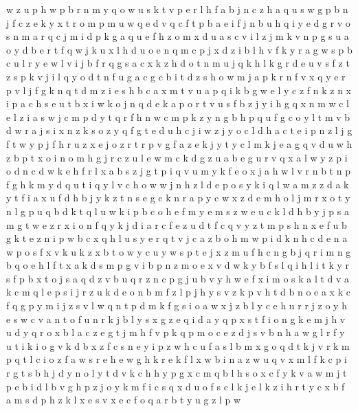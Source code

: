 \documentclass{article}
\begin{document}
w z u p h
w p b r n
m y q o w u s k t v p e r l h f a b j n
c z
h a q u s w g p b n j f c z e k y x t r o m
p m u w q e d
v q c f t p b a e i
f j n b u h q i y e d g r v o s
n m a r q c
j m i d p k g a q u e f h z o
m x d u
a s
c v
i l z j m k v n p g s u a o y d b e r t f q w
j k u x l h d
u o e n q m c p j x d z i b l h v f k y r a g w
s p b c
u l r
y e w l v i j b f r q g s a c x k z h d o t n m u
j q k
h l k g r d e u v s
f z t
z s p k v j i l q y o d t n f u g a c
g c b i t d z s h o w m j a p k r n f v x q y e
r p v l j f g k n q t d m z i e s h b c a
x m t v u a p q i k b g w e l y c z f n
k z n x i p a
c h s e u t b x i w k o j n q
d e k a p o r t v u s f b z j y i h g q x n m w c l
e l z i a s w j c m p d y t q r f h n
w c m p k z y n g b
h p q u f g c o y l t m v b d w r a j s i x n z
k s o z y q f g t e d u h c j i w
z j y o c l d
h a c t e i p n z l j g f
t w y p j f h r u z x e
j o z r t
r p v g f a z e k j y t
y c l m k j e a g q v d u w h z b p t x o
i n o m h g j r c z u
l e w m c k d g z u a
b e g u r v q x a l w y z p i o
d
n c d w k e h f r l x a b s z j g t p i q v u m y
k f e o x j a h w l v r n b
t n p f g h k m y d q
u t i q y l v c h o w
w j n h z l
d e p o s y k i q l w a m z
z d a k y t f
i a x u f d h b j y k z t n s e g c
k n r a p y c w x z d e m h o l j
m r x o t y n l g p u q b d k
t q l u w k i p b c o h e f
m
y e m
s z w e
u c k l d h b y j p s a m g t w e z r x i o n f q
y k j d i a r c f e z
u d t f c q v
y z t m p s h n x e f u b g
k t e z n i p w b c x q h l
u s y e r q t v j c a z b o h m w p i d k n
h c d e n a w p o s f x v k u
k z x b t o w y c u
y w s p t e j x z m u f h c n g b
j q r i m n g
b
q o e h l f t x a k d s m p g v i b
p n z m o e x v d w k y b f s l q i
h l i t k y r s f p b
x t o j s a q d z v b u
q r z n c p g j u b v y h w e f x i m o s k a l t d
v a k c m
q l e p s i j r z u k
d e o n b m f z l p j h y s v
z k p v
h t d b n o e a x k c f q g p y m i j z s v l w
q n t p d m k f g s i o a w x j z b l y c e h u r
r j z o y h e s w c v a n
t o f u n r k j b l y s x g z e q i d
a y q p x s t f i o n g k e m j h v u
d y q r o x b l a c z e g t j m h f v p k
q p m o c e z d j s v b n h a w g l r f y u t i k
i o g v k d b x z f c s
n e y i p z w h c u f a s l b m x g o q d t k j v r
k m p q t l c i o
z f a w s r e h
e w g h k
r e k f l x w b i n
a z w u q v x m l f k c p i r g t s b h j d y n o
l y t d v k c h
h y p g x c m q b
l h s o x c f y k v a w m j t p e b i d
l b v g h p z j o y k m f i c s q x d
u o f s c l k j
e l k z i h r t y c x b f a m s d p
h z k l x e
s v x e c f o q a r b t y u g z l p w
\end{document}
